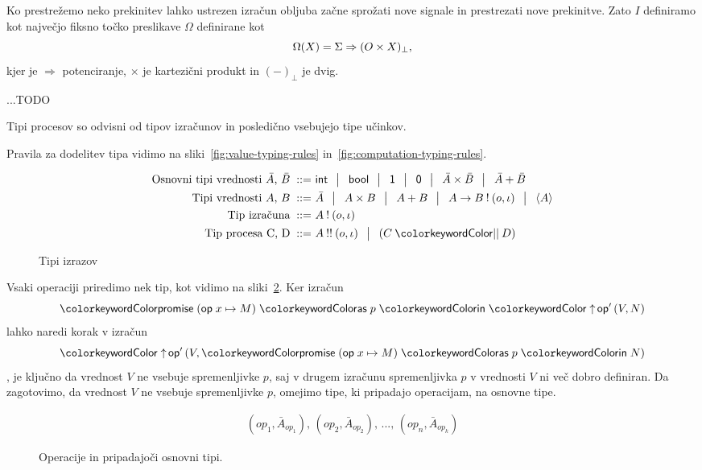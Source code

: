 Ko prestrežemo neko prekinitev lahko ustrezen izračun obljuba začne sprožati nove signale in prestrezati nove prekinitve. Zato $I$ definiramo kot največjo fiksno točko preslikave $\Omega$ definirane kot 
$$\Omega(X) = \Sigma \Rightarrow (O \times X)_\bot ,$$
kjer je $\Rightarrow$ potenciranje, $\times$ je kartezični produkt in $(-)_\bot$ je dvig.

...TODO

Tipi procesov so odvisni od tipov izračunov in posledično vsebujejo tipe učinkov.

Pravila za dodelitev tipa vidimo na sliki~\ref{fig:value-typing-rules} in~\ref{fig:computation-typing-rules}.


\begin{figure}[H]
	\parbox{\textwidth}{
		\centering
		\small
		\begin{align*}
		\text{Osnovni tipi vrednosti $\bar{A}$, $\bar{B}$}
		\bnfis & \tysym{int} \,\bnfor\! \tysym{bool} \,\bnfor\! \tyunit \,\bnfor\! \tyempty \,\bnfor\! \typrod{\bar{A}}{\bar{B}} \,\bnfor\! \tysum{\bar{A}}{\bar{B}}
		\\%
		\text{Tipi vrednosti $A$, $B$}
		\bnfis & \bar{A} \, \bnfor\! \typrod{A}{B} \,\bnfor\! \tysum{A}{B} \,\bnfor\! \tyfun{A}{\tycomp{B}{\o,\i}} \,\bnfor\! \typromise{A}
		\\
		\text{Tip izračuna} \bnfis& \tycomp{A}{\o,\i}
		\\
		\text{Tip procesa \tyC, \tyD}  \bnfis & \tyrun{A}{\o, \i} \,\bnfor\! \typar{\tyC}{\tyD}
		\end{align*}
	} 
	\caption{Tipi izrazov}
	\label{fig:tipi}
\end{figure}

Vsaki operaciji priredimo nek tip, kot vidimo na sliki~\ref{fig:operacije}. Ker izračun 
$$ \tmwith{op}{x}{M}{p}{\tmopout{op'}{V}{N}} $$
lahko naredi korak v izračun
$$ \tmopout{op'}{V}{\tmwith{op}{x}{M}{p}{N}} $$,
je ključno da vrednost $V$ ne vsebuje spremenljivke $p$, saj v drugem izračunu spremenljivka $p$ v vrednosti $V$ ni več dobro definiran. Da zagotovimo, da vrednost $V$ ne vsebuje spremenljivke $p$, omejimo tipe, ki pripadajo operacijam, na osnovne tipe.

\begin{figure}[H]
	\centering
	\small
	\begin{align*}
	(op_1, \bar{A}_{op_1}),\, (op_2, \bar{A}_{op_2}),\, ... ,\, (op_n, \bar{A}_{op_k})
	\end{align*}
\vspace{-5ex}
	\caption{Operacije in pripadajoči osnovni tipi.}
	\label{fig:operacije}
\end{figure}



